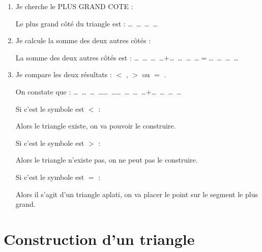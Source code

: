 \documentclass[a4paper,10pt]{report}
\begin{document}
\vspace{-3mm}
\begin{meth}

\begin{enumerate}
\item Je cherche le PLUS GRAND COTE : 
\begin{center}
Le plus grand côté du triangle est : \dots ~\dots ~\dots ~\dots
\end{center}

\item Je calcule la somme des deux autres côtés :
\begin{center}
La somme des deux autres côtés est : \dots ~\dots ~\dots ~\dots$ + $\dots ~\dots ~\dots ~\dots$ = $\dots ~\dots ~\dots ~\dots
\end{center}

\item Je compare les deux résultats : \quad $<$ \quad , \quad $>$ \quad ou \quad $=$ .
\begin{center}
On constate que : \dots ~\dots ~\dots ~\dots \quad \dots ~\dots \quad \dots ~\dots ~\dots ~\dots$ + $\dots ~\dots ~\dots ~\dots
\end{center}

\vspace{3mm}
\begin{minipage}{5cm}
Si c'est le symbole est $<$ :

\medskip
Alors le triangle
existe, on va pouvoir
le construire.
\end{minipage}
\hspace{5mm}
\begin{minipage}{5cm}
Si c'est le symbole est $>$ :

\medskip
Alors le triangle
n'existe pas, on ne
peut pas le
construire.
\end{minipage}
\hspace{5mm}
\begin{minipage}{5cm}
Si c'est le symbole est $=$ :

\medskip
Alors il s'agit d'un
triangle aplati, on va
placer le point sur le
segment le plus grand.
\end{minipage}
\end{enumerate}
\end{meth}

\section{Construction d'un triangle}
\end{document}
